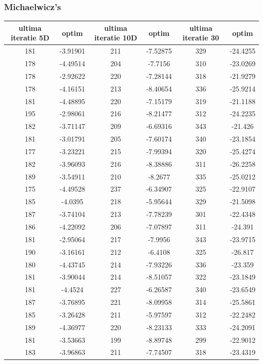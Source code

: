 \documentclass{article}
\begin{document}
\subsubsection{Michaelwicz’s}
\begin{tabular}{cccccc}
\hline
ultima iteratie 5D& optim&ultima iteratie 10D& optim&ultima iteratie 30&optim\\
\hline
181&-3.91901&211&-7.52875&329&-24.4255 \\ \hline
178&-4.49514&204&-7.7156&310&-23.0269 \\ \hline
178&-2.92622&220&-7.28144&318&-21.9279 \\ \hline
178&-4.16151&213&-8.40654&336&-25.9214 \\ \hline
181&-4.48895&220&-7.15179&319&-21.1188 \\ \hline
195&-2.98061&216&-8.21477&312&-24.2235 \\ \hline
182&-3.71147&209&-6.69316&343&-21.426 \\ \hline
181&-3.01791&205&-7.60174&340&-23.1854 \\ \hline
177&-3.23221&215&-7.99394&320&-25.4274 \\ \hline
182&-3.96093&216&-8.38886&311&-26.2258 \\ \hline
189&-3.54911&210&-8.2677&335&-25.0212 \\ \hline
175&-4.49528&237&-6.34907&325&-22.9107 \\ \hline
185&-4.0395&218&-5.95644&329&-21.5098 \\ \hline
187&-3.74104&213&-7.78239&301&-22.4348 \\ \hline
186&-4.22092&206&-7.07897&311&-24.391 \\ \hline
181&-2.95064&217&-7.9956&343&-23.9715 \\ \hline
190&-3.16161&212&-6.4108&325&-26.817 \\ \hline
180&-4.43745&214&-7.93226&336&-23.359 \\ \hline
181&-3.90044&214&-8.51057&322&-23.1849 \\ \hline
181&-4.4524&227&-6.26587&340&-23.6549 \\ \hline
187&-3.76895&221&-8.09958&314&-25.5861 \\ \hline
185&-3.26428&211&-5.97597&312&-22.2482 \\ \hline
189&-4.36977&220&-8.23133&333&-24.2091 \\ \hline
181&-3.53663&199&-8.89748&299&-22.9012 \\ \hline
183&-3.96863&211&-7.74507&318&-23.4319 \\ \hline

\end{tabular}
\end{document}
